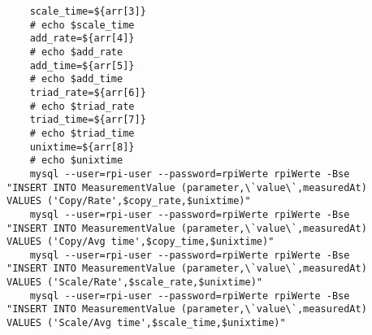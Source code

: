 \begin{verbatim}
    scale_time=${arr[3]}                                                                                                                                                    
    # echo $scale_time                                                                                                                                                      
    add_rate=${arr[4]}                                                                                                                                                      
    # echo $add_rate                                                                                                                                                        
    add_time=${arr[5]}
    # echo $add_time                                                                                                                                                        
    triad_rate=${arr[6]}                                                                                                                                                    
    # echo $triad_rate                                                                                                                                                      
    triad_time=${arr[7]}                                                                                                                                                    
    # echo $triad_time                                                                                                                                                      
    unixtime=${arr[8]}                                                                                                                                                      
    # echo $unixtime                                                                                                                                                        
    mysql --user=rpi-user --password=rpiWerte rpiWerte -Bse 
"INSERT INTO MeasurementValue (parameter,\`value\`,measuredAt) 
VALUES ('Copy/Rate',$copy_rate,$unixtime)"       
    mysql --user=rpi-user --password=rpiWerte rpiWerte -Bse 
"INSERT INTO MeasurementValue (parameter,\`value\`,measuredAt) 
VALUES ('Copy/Avg time',$copy_time,$unixtime)"   
    mysql --user=rpi-user --password=rpiWerte rpiWerte -Bse 
"INSERT INTO MeasurementValue (parameter,\`value\`,measuredAt) 
VALUES ('Scale/Rate',$scale_rate,$unixtime)"     
    mysql --user=rpi-user --password=rpiWerte rpiWerte -Bse 
"INSERT INTO MeasurementValue (parameter,\`value\`,measuredAt) 
VALUES ('Scale/Avg time',$scale_time,$unixtime)"

\end{verbatim}
